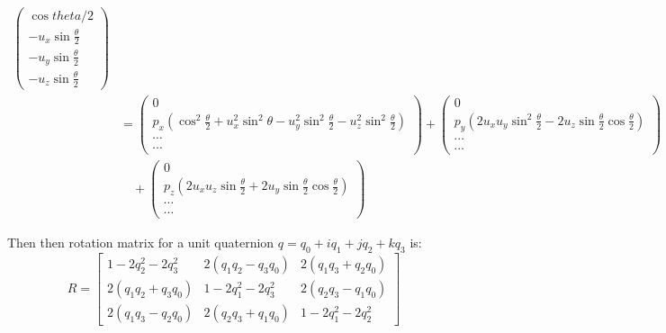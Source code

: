 \documentclass{article}
\begin{document}
\begin{displaymath}
\begin{aligned}
\begin{pmatrix}
      \cos{theta/2}  \\
      -u_x\sin{\frac{\theta}{2}}  \\
      -u_y\sin{\frac{\theta}{2}}  \\
      -u_z\sin{\frac{\theta}{2}}
    \end{pmatrix} \\
    &= \begin{pmatrix} 0 \\
      p_x(\cos^2{\frac{\theta}{2}}+u_x^2\sin^2{\theta}-u_y^2\sin^2{\frac{\theta}{2}}-u_z^2\sin^2{\frac{\theta}{2}}) \\
      \cdots \\ \cdots \end{pmatrix} 
    + \begin{pmatrix}
      0 \\
      p_y(2u_xu_y\sin^2{\frac{\theta}{2}}-2u_z\sin{\frac{\theta}{2}}\cos{\frac{\theta}{2}}) \\
      \cdots \\ \cdots \end{pmatrix} \\
    & \quad + \begin{pmatrix} 0 \\
      p_z(2u_xu_z\sin{\frac{\theta}{2}}+2u_y\sin{\frac{\theta}{2}}\cos{\frac{\theta}{2}})  \\
      \cdots \\ \cdots \end{pmatrix}
  \end{aligned}
\end{displaymath}

Then then rotation matrix for a unit quaternion $q = q_0 + iq_1 + jq_2 + kq_3$ is:
\begin{equation}
  R = \begin{bmatrix}
    1-2q_2^2-2q_3^2 & 2(q_1q_2-q_3q_0)  & 2(q_1q_3+q_2q_0)  \\
    2(q_1q_2+q_3q_0)  & 1-2q_1^2-2q_3^2 & 2(q_2q_3-q_1q_0)  \\
    2(q_1q_3-q_2q_0)  & 2(q_2q_3+q_1q_0)  & 1-2q_1^2-2q_2^2
  \end{bmatrix}
\end{equation}
\end{document}
